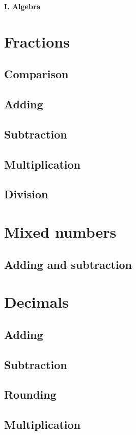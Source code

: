 \documentclass[a4paper, 12pt]{article}
\begin{document}
	
	{\huge \textbf{I. Algebra}}

	{\Large \section {Fractions}}

	\subsection{Comparison}
	\subsection{Adding}
	\subsection{Subtraction}
	\subsection{Multiplication}
	\subsection{Division}

	{\Large \section {Mixed numbers}}

	\subsection{Adding and subtraction}

	{\Large \section {Decimals}}
	
	\subsection{Adding}
	\subsection{Subtraction}
	\subsection{Rounding}
	\subsection{Multiplication}
\end{document}
